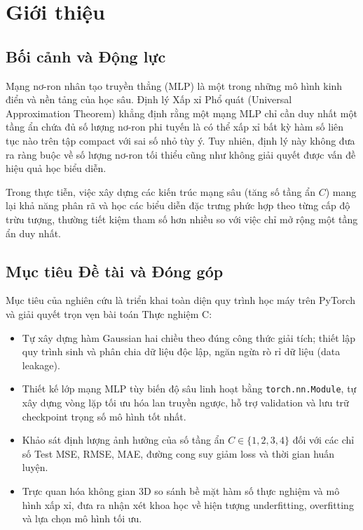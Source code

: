 \documentclass[a4paper,13pt]{extarticle}
\begin{document}
\fontsize{13}{15}\selectfont
\titlespacing*{\section}{0pt}{2ex}{2ex}

\section{Giới thiệu}
\subsection{Bối cảnh và Động lực}
Mạng nơ-ron nhân tạo truyền thẳng (MLP) là một trong những mô hình kinh điển và nền tảng của học sâu. Định lý Xấp xỉ Phổ quát (Universal Approximation Theorem) khẳng định rằng một mạng MLP chỉ cần duy nhất một tầng ẩn chứa đủ số lượng nơ-ron phi tuyến là có thể xấp xỉ bất kỳ hàm số liên tục nào trên tập compact với sai số nhỏ tùy ý. Tuy nhiên, định lý này không đưa ra ràng buộc về số lượng nơ-ron tối thiểu cũng như không giải quyết được vấn đề hiệu quả học biểu diễn.

Trong thực tiễn, việc xây dựng các kiến trúc mạng sâu (tăng số tầng ẩn $C$) mang lại khả năng phân rã và học các biểu diễn đặc trưng phức hợp theo từng cấp độ trừu tượng, thường tiết kiệm tham số hơn nhiều so với việc chỉ mở rộng một tầng ẩn duy nhất.

\subsection{Mục tiêu Đề tài và Đóng góp}
Mục tiêu của nghiên cứu là triển khai toàn diện quy trình học máy trên PyTorch và giải quyết trọn vẹn bài toán Thực nghiệm C:
\begin{itemize}
    \item Tự xây dựng hàm Gaussian hai chiều theo đúng công thức giải tích; thiết lập quy trình sinh và phân chia dữ liệu độc lập, ngăn ngừa rò rỉ dữ liệu (data leakage).
    \item Thiết kế lớp mạng MLP tùy biến độ sâu linh hoạt bằng \texttt{torch.nn.Module}, tự xây dựng vòng lặp tối ưu hóa lan truyền ngược, hỗ trợ validation và lưu trữ checkpoint trọng số mô hình tốt nhất.
    \item Khảo sát định lượng ảnh hưởng của số tầng ẩn $C \in \{1, 2, 3, 4\}$ đối với các chỉ số Test MSE, RMSE, MAE, đường cong suy giảm loss và thời gian huấn luyện.
    \item Trực quan hóa không gian 3D so sánh bề mặt hàm số thực nghiệm và mô hình xấp xỉ, đưa ra nhận xét khoa học về hiện tượng underfitting, overfitting và lựa chọn mô hình tối ưu.
\end{itemize}
\end{document}

